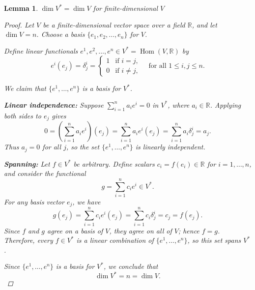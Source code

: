 \documentclass[11pt]{article}
\newtheorem{lemma}{Lemma}
\begin{document}
\begin{lemma}
$\dim V^* = \dim V$ for finite-dimensional $V$

\begin{proof}

Let $V$ be a finite-dimensional vector space over a field $\mathbb{R}$, and let $\dim V = n$.  
Choose a basis $\{e_1, e_2, \dots, e_n\}$ for $V$.

Define linear functionals $e^1, e^2, \dots, e^n \in V^* = \operatorname{Hom}(V, \mathbb{R})$ by
\[
e^i(e_j) = \delta^i_j =
\begin{cases}
1 & \text{if } i = j, \\
0 & \text{if } i \ne j,
\end{cases}
\quad \text{for all } 1 \le i,j \le n.
\]

We claim that $\{e^1, \dots, e^n\}$ is a basis for $V^*$.

\medskip

\noindent\textbf{Linear independence:}  
Suppose $\sum_{i=1}^n a_i e^i = 0$ in $V^*$, where $a_i \in \mathbb{R}$.  
Applying both sides to $e_j$ gives
\[
0 = \left( \sum_{i=1}^n a_i e^i \right)(e_j) = \sum_{i=1}^n a_i e^i(e_j) = \sum_{i=1}^n a_i \delta^i_j = a_j.
\]
Thus $a_j = 0$ for all $j$, so the set $\{e^1, \dots, e^n\}$ is linearly independent.

\medskip

\noindent\textbf{Spanning:}  
Let $f \in V^*$ be arbitrary. Define scalars $c_i = f(e_i) \in \mathbb{R}$ for $i = 1, \dots, n$, and consider the functional
\[
g = \sum_{i=1}^n c_i e^i \in V^*.
\]
For any basis vector $e_j$, we have
\[
g(e_j) = \sum_{i=1}^n c_i e^i(e_j) = \sum_{i=1}^n c_i \delta^i_j = c_j = f(e_j).
\]
Since $f$ and $g$ agree on a basis of $V$, they agree on all of $V$; hence $f = g$.  
Therefore, every $f \in V^*$ is a linear combination of $\{e^1, \dots, e^n\}$, so this set spans $V^*$.

\medskip

Since $\{e^1, \dots, e^n\}$ is a basis for $V^*$, we conclude that
\[
\dim V^* = n = \dim V.
\]

\end{proof}
\end{lemma}
\end{document}

